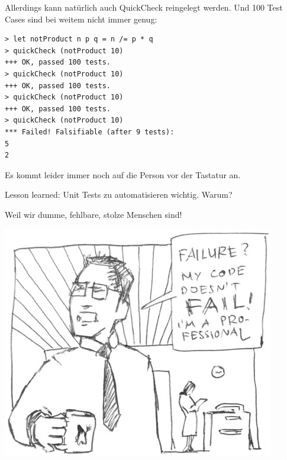 \documentclass{beamer}
\begin{document}

\begin{frame}[fragile]
Allerdings kann natürlich auch QuickCheck reingelegt werden. Und 100 Test Cases sind 
bei weitem nicht immer genug:
\pause

\begin{verbatim}
> let notProduct n p q = n /= p * q
> quickCheck (notProduct 10)
+++ OK, passed 100 tests.
> quickCheck (notProduct 10)
+++ OK, passed 100 tests.
> quickCheck (notProduct 10)
+++ OK, passed 100 tests.
> quickCheck (notProduct 10)
*** Failed! Falsifiable (after 9 tests):                  
5
2
\end{verbatim}
\pause

Es kommt leider immer noch auf die Person vor der Tastatur an.
\end{frame}


\begin{frame}
Lesson learned: Unit Tests zu automatisieren wichtig. Warum?\pause

Weil wir dumme, fehlbare, stolze Menschen sind!

\begin{center}
\includegraphics[scale=0.45]{unit_tests.jpg} 
\end{center}

\end{frame}

\end{document}
